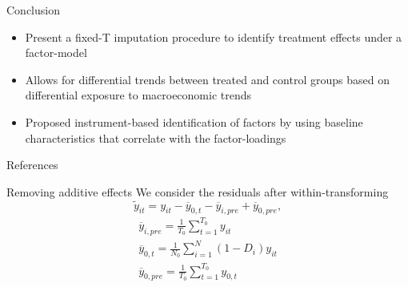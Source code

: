 \documentclass[aspectratio=43,t,11pt]{beamer}
\begin{document}
\begin{frame}{Conclusion}
  \begin{itemize}
    \item Present a fixed-T imputation procedure to identify treatment effects under a factor-model 
    
    \item Allows for differential trends between treated and control groups based on differential exposure to macroeconomic trends
    
    \item Proposed instrument-based identification of factors by using baseline characteristics that correlate with the factor-loadings
  \end{itemize}
\end{frame}

\begin{frame}[allowframebreaks]{References}
  \printbibliography
\end{frame}
\appendix

\begin{frame}{Removing additive effects}
  We consider the residuals after within-transforming
  $$
    \tilde{y}_{it} = y_{it} - \overline{y}_{0,t} - \overline{y}_{i,pre} + \overline{y}_{0,pre},
  $$
  \begin{gather*}
    \overline{y}_{i, pre} = \frac{1}{T_0} \sum_{t = 1}^{T_0} y_{it} \\
    \overline{y}_{0, t} = \frac{1}{N_{0}} \sum_{i = 1}^N (1 - D_i) y_{it} \\
    \overline{y}_{0, pre} = \frac{1}{T_0} \sum_{t = 1}^{T_0} y_{0, t}
  \end{gather*}

\end{frame}
\end{document}
